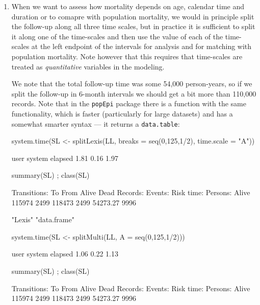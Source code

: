 \begin{enumerate}
\item When we want to assess how mortality depends on age, calendar
  time and duration or to comapre with population mortality, we would
  in principle split the follow-up along all three time scales, but in
  practice it is sufficient to split it along one of the time-scales
  and then use the value of each of the time-scales at the left
  endpoint of the intervals for analysis and for matching with
  population mortality. Note however that this requires that
  time-scales are treated as \emph{quantitative} variables in the
  modeling.

  We note that the total follow-up time was some 54,000 person-years,
  so if we split the follow-up in 6-month intervals we should get a
  bit more than 110,000 records. Note that in the \texttt{popEpi}
  package there is a function with the same functionality, which is
  faster (particularly for large datasets) and has a somewhat smarter
  syntax --- it returns a \texttt{data.table}:
\begin{Schunk}
\begin{Sinput}
 system.time(SL <- splitLexis(LL, breaks = seq(0,125,1/2), time.scale = "A"))
\end{Sinput}
\begin{Soutput}
   user  system elapsed 
   1.81    0.16    1.97 
\end{Soutput}
\begin{Sinput}
 summary(SL) ; class(SL)
\end{Sinput}
\begin{Soutput}
Transitions:
     To
From     Alive Dead  Records:  Events: Risk time:  Persons:
  Alive 115974 2499    118473     2499   54273.27      9996
\end{Soutput}
\begin{Soutput}
[1] "Lexis"      "data.frame"
\end{Soutput}
\begin{Sinput}
 system.time(SL <- splitMulti(LL, A = seq(0,125,1/2)))
\end{Sinput}
\begin{Soutput}
   user  system elapsed 
   1.06    0.22    1.13 
\end{Soutput}
\begin{Sinput}
 summary(SL) ; class(SL)
\end{Sinput}
\begin{Soutput}
Transitions:
     To
From     Alive Dead  Records:  Events: Risk time:  Persons:
  Alive 115974 2499    118473     2499   54273.27      9996
\end{Soutput}

\end{Schunk}
\end{enumerate}
